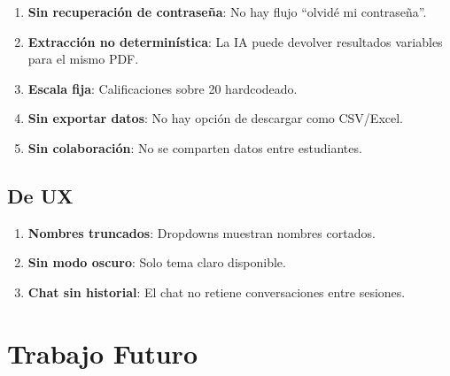 \documentclass[
  spanish,
  11pt,
  a4paper,
]{article}
\providecommand{\tightlist}{%
  \setlength{\itemsep}{0pt}\setlength{\parskip}{0pt}}
\begin{document}
\begin{enumerate}
\def\labelenumi{\arabic{enumi}.}
\setcounter{enumi}{4}
\tightlist
\item
  \textbf{Sin recuperación de contraseña}: No hay flujo ``olvidé mi
  contraseña''.
\item
  \textbf{Extracción no determinística}: La IA puede devolver resultados
  variables para el mismo PDF.
\item
  \textbf{Escala fija}: Calificaciones sobre 20 hardcodeado.
\item
  \textbf{Sin exportar datos}: No hay opción de descargar como
  CSV/Excel.
\item
  \textbf{Sin colaboración}: No se comparten datos entre estudiantes.
\end{enumerate}

\subsection{De UX}\label{de-ux}

\begin{enumerate}
\def\labelenumi{\arabic{enumi}.}
\setcounter{enumi}{9}
\tightlist
\item
  \textbf{Nombres truncados}: Dropdowns muestran nombres cortados.
\item
  \textbf{Sin modo oscuro}: Solo tema claro disponible.
\item
  \textbf{Chat sin historial}: El chat no retiene conversaciones entre
  sesiones.
\end{enumerate}

\section{Trabajo Futuro}\label{trabajo-futuro}
\end{document}
